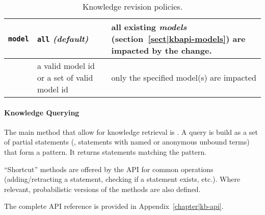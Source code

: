 \begin{table}
\begin{center}
\begin{tabular}{lp{4cm}p{9cm}}
    \midrule
    
    {\tt model} & {\tt all} \emph{(default)} & all existing \emph{models}
    (section~\ref{sect|kbapi-models}) are impacted by the change.\\

    \midrule
    
    & a valid model id or a set of valid model id & only the specified model(s)
    are impacted\\
    
    \bottomrule
    
    \end{tabular}

\end{center}
\caption{Knowledge revision policies.}
\label{table|knowledge-policies}
\end{table}

\paragraph{Knowledge Querying} The main method that allow for knowledge
retrieval is . A  query is build as a set of partial
statements (\ie, statements with named or anonymous unbound terms) that form a
pattern. It returns statements matching the pattern.

``Shortcut'' methods are offered by the API for common operations
(adding/retracting a statement, checking if a statement exists, etc.). Where
relevant, probabilistic versions of the methods are also defined.

The complete API reference is provided in Appendix~\ref{chapter|kb-api}.

